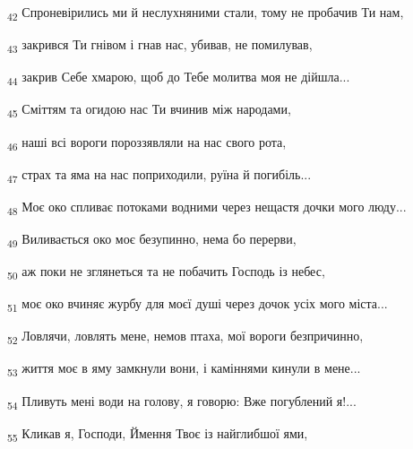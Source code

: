 \begin{tcolorbox}
\textsubscript{42} Спроневірились ми й неслухняними стали, тому не пробачив Ти нам,
\end{tcolorbox}
\begin{tcolorbox}
\textsubscript{43} закрився Ти гнівом і гнав нас, убивав, не помилував,
\end{tcolorbox}
\begin{tcolorbox}
\textsubscript{44} закрив Себе хмарою, щоб до Тебе молитва моя не дійшла...
\end{tcolorbox}
\begin{tcolorbox}
\textsubscript{45} Сміттям та огидою нас Ти вчинив між народами,
\end{tcolorbox}
\begin{tcolorbox}
\textsubscript{46} наші всі вороги пороззявляли на нас свого рота,
\end{tcolorbox}
\begin{tcolorbox}
\textsubscript{47} страх та яма на нас поприходили, руїна й погибіль...
\end{tcolorbox}
\begin{tcolorbox}
\textsubscript{48} Моє око спливає потоками водними через нещастя дочки мого люду...
\end{tcolorbox}
\begin{tcolorbox}
\textsubscript{49} Виливається око моє безупинно, нема бо перерви,
\end{tcolorbox}
\begin{tcolorbox}
\textsubscript{50} аж поки не зглянеться та не побачить Господь із небес,
\end{tcolorbox}
\begin{tcolorbox}
\textsubscript{51} моє око вчиняє журбу для моєї душі через дочок усіх мого міста...
\end{tcolorbox}
\begin{tcolorbox}
\textsubscript{52} Ловлячи, ловлять мене, немов птаха, мої вороги безпричинно,
\end{tcolorbox}
\begin{tcolorbox}
\textsubscript{53} життя моє в яму замкнули вони, і каміннями кинули в мене...
\end{tcolorbox}
\begin{tcolorbox}
\textsubscript{54} Пливуть мені води на голову, я говорю: Вже погублений я!...
\end{tcolorbox}
\begin{tcolorbox}
\textsubscript{55} Кликав я, Господи, Ймення Твоє із найглибшої ями,
\end{tcolorbox}
